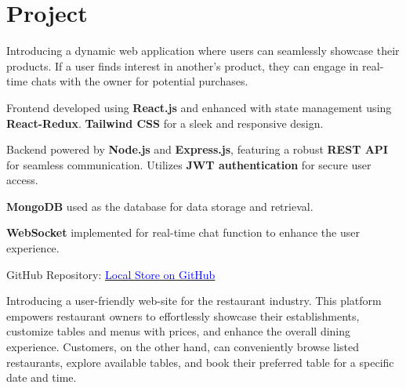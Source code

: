 \documentclass{deedy-resume-openfont}
\begin{document}
\begin{minipage}[t]{0.66\textwidth} 


\section{Project}




\vspace{\topsep} %
\begin{tightemize}
\item Introducing a dynamic web application where users can seamlessly showcase their products. If a user finds interest in another's product, they can engage in real-time chats with the owner for potential purchases.
\item Frontend developed using \textbf{React.js} and enhanced with state management using \textbf{React-Redux}. \textbf{Tailwind CSS} for a sleek and responsive design.
 
\item Backend powered by \textbf{Node.js} and \textbf{Express.js}, featuring a robust \textbf{REST API} for seamless communication. Utilizes \textbf{JWT authentication} for secure user access.



\item \textbf{MongoDB} used as the database for data storage and retrieval.

\item \textbf{WebSocket} implemented for real-time chat function to enhance the user experience.
\usepackage{hyperref}

\item GitHub Repository: \href{https://github.com/RudraSarkar5/Local_Store}{\textcolor{blue}{Local Store on GitHub}}


\end{tightemize}
\sectionsep


\begin{tightemize}
\item Introducing a user-friendly web-site for the restaurant industry. This platform empowers restaurant owners to effortlessly showcase their establishments, customize tables and  menus with prices, and enhance the overall dining experience. Customers, on the other hand, can conveniently browse listed restaurants, explore available tables, and book their preferred table for a specific date and time.


\end{tightemize}
\end{minipage}
\end{document}
